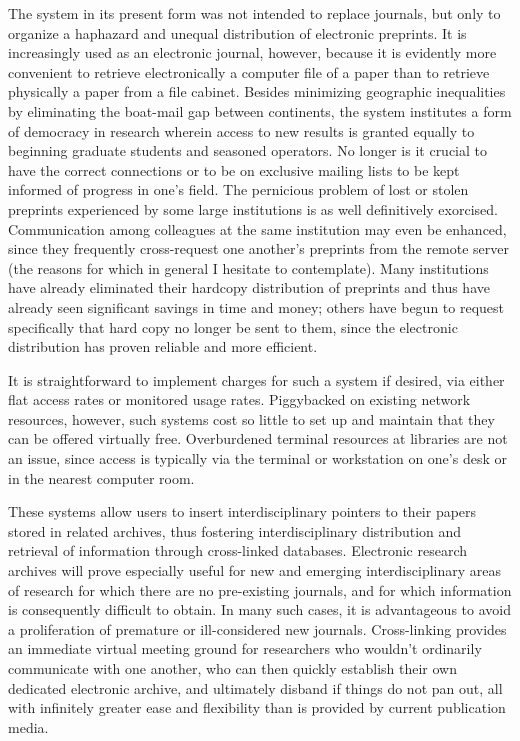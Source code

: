 \medskip{}

The system in its present form was not intended to replace journals, but only
to organize a haphazard and unequal distribution of electronic preprints. It is
increasingly used as an electronic journal, however, because it is evidently
more convenient to retrieve electronically a computer file of a paper than to
retrieve physically a paper from a file cabinet. Besides minimizing geographic
inequalities by eliminating the boat-mail gap between continents, the system
institutes a form of democracy in research wherein access to new results is
granted equally to beginning graduate students and seasoned operators. No
longer is it crucial to have the correct connections or to be on exclusive
mailing lists to be kept informed of progress in one's field. The pernicious
problem of lost or stolen preprints experienced by some large institutions is
as well definitively exorcised. Communication among colleagues at the same
institution may even be enhanced, since they frequently cross-request one
another's preprints from the remote server (the reasons for which in general I
hesitate to contemplate). Many institutions have already eliminated
their hardcopy distribution of preprints and thus have already seen significant
savings in time and money; others have begun to request specifically that
hard copy no longer be sent to them, since the electronic distribution has
proven reliable and more efficient.

It is straightforward to implement charges for such a system if desired,
via either flat access rates or monitored usage rates. Piggybacked on existing
network resources, however, such systems cost so little to set up
and maintain that they can be offered virtually free. Overburdened terminal
resources at libraries are not an issue, since access is typically
via the terminal or workstation on one's desk or in the nearest computer room.

These systems allow users to insert interdisciplinary pointers to their papers
stored in related archives, thus fostering interdisciplinary distribution and
retrieval of information through cross-linked databases. Electronic research
archives will prove especially useful for new and emerging interdisciplinary
areas of research for which there are no pre-existing journals, and for which
information is consequently difficult to obtain. In many such cases, it is
advantageous to avoid a proliferation of premature or ill-considered new
journals. Cross-linking provides an immediate virtual meeting ground for
researchers who wouldn't ordinarily communicate with one another, who can then
quickly establish their own dedicated electronic archive, and ultimately
disband if things do not pan out, all with infinitely greater ease and
flexibility than is provided by current publication media.

